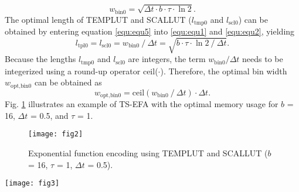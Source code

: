 \documentclass[10pt,journal]{IEEEtran}
\begin{document}
\begin{equation}\label{equ:equ5}
    w_\textrm{bin0} = \sqrt{\Delta t\cdot b\cdot\tau\cdot \ln2}.	
\end{equation}
The optimal length of TEMP\textunderscore LUT and SCAL\textunderscore LUT ($l_\textrm{tmp0}$ and $l_\textrm{scl0}$) can be obtained by entering equation \eqref{equ:equ5} into \eqref{equ:equ1} and \eqref{equ:equ2}, yielding
\begin{equation}\label{equ:equ6}
    l_\textrm{tpl0} = l_\textrm{scl0} 
    = w_\textrm{bin0}\mathbin{/}\Delta t 
    = \sqrt{b\cdot \tau \cdot \ln2 \mathbin{/}\Delta t}.
\end{equation}
Because the lengths $l_\textrm{tmp0}$ and $l_{\textrm{scl0}}$ are integers, the term $w_\textrm{bin0}$$\mathbin{/}$$\Delta t$ needs to be integerized using a round-up operator ceil($\cdot$). 
Therefore, the optimal bin width $w_\textrm{opt,bin0}$ can be obtained as
\begin{equation}\label{equ:equ7}
    w_\textrm{opt,bin0} = \textrm{ceil}(w_\textrm{bin0}\mathbin{/}\Delta t) \cdot \Delta t.	
\end{equation}
Fig. \ref{fig:fig2} illustrates an example of TS-EFA with the optimal memory usage for $b$ = 16, $\Delta t$ = 0.5, and $\tau$ = 1.

\begin{figure}[tbh]\centering
    \texttt{[image: fig2]}
    \caption{\label{fig:fig2} Exponential function encoding using TEMP\textunderscore LUT and SCAL\textunderscore LUT ($b$ = 16, $\tau$ = 1, $\Delta t$ = 0.5).}
\end{figure}

\begin{figure*}[tbh]\centering
    \texttt{[image: fig3]}
    \caption{\label{fig:fig3} RTL and timing diagrams of the EXP\textunderscore FIX module.} 
\end{figure*}
\end{document}
